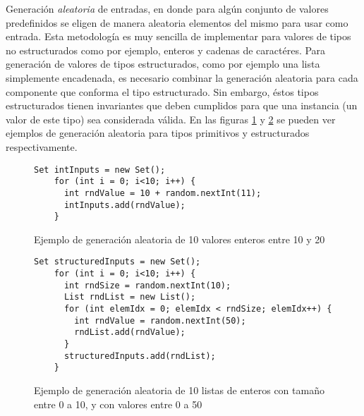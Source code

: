 Generaci\'on \emph{aleatoria} de entradas, en donde para alg\'un conjunto de valores predefinidos se eligen de manera aleatoria elementos del mismo para usar como entrada. Esta metodolog\'ia es muy sencilla de implementar para valores de tipos no estructurados como por ejemplo, enteros y cadenas de caract\'eres. Para generaci\'on de valores de tipos estructurados, como por ejemplo una lista simplemente encadenada, es necesario combinar la generaci\'on aleatoria para cada componente que conforma el tipo estructurado. Sin embargo, \'estos tipos estructurados tienen invariantes que deben cumplidos para que una instancia (un valor de este tipo) sea considerada v\'alida. En las figuras \ref{figures.examples.testing.random.primitive} y \ref{figures.examples.testing.random.structure} se pueden ver ejemplos de generaci\'on aleatoria para tipos primitivos y estructurados respectivamente. %

\begin{figure}
	\begin{lstlisting}[frame=single, mathescape=true,framexleftmargin=1.5em]
    Set intInputs = new Set();
    for (int i = 0; i<10; i++) {
      int rndValue = 10 + random.nextInt(11);
      intInputs.add(rndValue);
    }
	\end{lstlisting}
	\caption{Ejemplo de generaci\'on aleatoria de 10 valores enteros entre 10 y 20}
	\label{figures.examples.testing.random.primitive}
\end{figure}

\begin{figure}
	\begin{lstlisting}[frame=single, mathescape=true,framexleftmargin=1.5em]
    Set structuredInputs = new Set();
    for (int i = 0; i<10; i++) {
      int rndSize = random.nextInt(10);
      List rndList = new List();
      for (int elemIdx = 0; elemIdx < rndSize; elemIdx++) {
        int rndValue = random.nextInt(50);
        rndList.add(rndValue);
      }
      structuredInputs.add(rndList);
    }
	\end{lstlisting}
	\caption{Ejemplo de generaci\'on aleatoria de 10 listas de enteros con tama\~no entre 0 a 10, y con valores entre 0 a 50}
	\label{figures.examples.testing.random.structure}
\end{figure}

